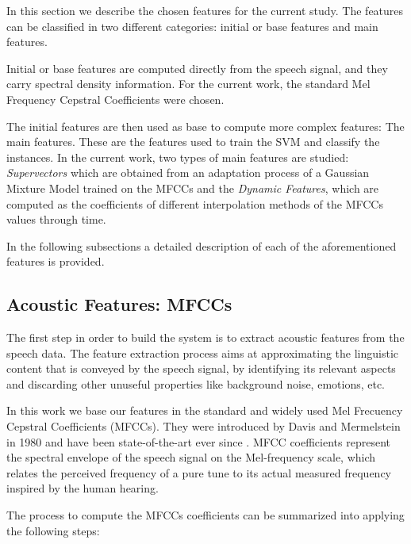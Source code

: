 In this section we describe the chosen features for the current study. The features can be classified in two different categories: initial or base features and main features.

Initial or base features are computed directly from the speech signal, and they carry spectral density information. For the current work, the standard Mel Frequency Cepstral Coefficients
were chosen.

The initial features are then used as base to compute more complex features:
The main features. These
are the features used to train the SVM and classify the instances. In the current work, two
types of main features are studied: \textit{Supervectors}
which are obtained from an adaptation process of
a Gaussian Mixture Model trained on the MFCCs and the \textit{Dynamic Features},
which are computed
as the coefficients of different interpolation methods of the MFCCs values through time.

In the following subsections a detailed description of each of the aforementioned features is
provided.

\subsection{Acoustic Features: MFCCs}

The first step in order to build the system is to extract acoustic features from the speech data.
The feature extraction process aims at approximating the linguistic content that is conveyed
by the speech signal, by identifying its relevant aspects and discarding other unuseful
properties like background noise, emotions, etc.

In this work we base our features in the standard and widely used Mel Frecuency
Cepstral Coefficients (MFCCs). They were introduced by Davis and Mermelstein in 1980 and
have been state-of-the-art ever since \cite{mfcc_foundational}.
MFCC coefficients represent the spectral envelope of the speech signal on the Mel-frequency scale,
which relates the perceived frequency of a pure tune to its actual measured frequency inspired
by the human hearing.

The process to compute the MFCCs coefficients can be summarized into applying the following steps:

